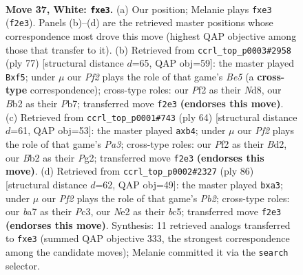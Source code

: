 \documentclass[11pt]{article}
\begin{document}
\clearpage

\begin{figure}[p]\centering
\begin{subfigure}{0.46\textwidth}\centering
\resizebox{\linewidth}{!}{%
\newchessgame
\chessboard[
  setfen={r5k1/b3n3/8/pp2N3/b1p3P1/P1P1p3/1B2NP2/R3K3 w - - 0 37},
  showmover=false,
  pgfstyle=straightmove, color=movearrow, markmove={f2-e3}
]}
\caption{}
\end{subfigure}\hfill
\begin{subfigure}{0.46\textwidth}\centering
\resizebox{\linewidth}{!}{%
\newchessgame
\chessboard[
  setfen={r2n2k1/1p3pp1/4P2p/5P2/p3b3/B5PP/B2R4/6K1 b - - 0 39},
  showmover=false,
  pgfstyle=straightmove, color=movearrow, markmove={e4-f5}
]}
\caption{}
\end{subfigure}
\\[4pt]
\begin{subfigure}{0.46\textwidth}\centering
\resizebox{\linewidth}{!}{%
\newchessgame
\chessboard[
  setfen={1r4k1/4n1b1/p5p1/4p2p/1pN1P3/P6P/3B2P1/4RK2 w - - 0 33},
  showmover=false,
  pgfstyle=straightmove, color=movearrow, markmove={a3-b4}
]}
\caption{}
\end{subfigure}\hfill
\begin{subfigure}{0.46\textwidth}\centering
\resizebox{\linewidth}{!}{%
\newchessgame
\chessboard[
  setfen={2r1b3/1p3p1k/5Bpp/2b1P3/5N1P/p1P3K1/1P4P1/3R4 w - - 0 44},
  showmover=false,
  pgfstyle=straightmove, color=movearrow, markmove={b2-a3}
]}
\caption{}
\end{subfigure}
\caption{\textbf{Move 37, White: \texttt{fxe3}.} (a) Our position; Melanie plays \texttt{fxe3} (\texttt{f2e3}). Panels (b)--(d) are the retrieved master positions whose correspondence most drove this move (highest QAP objective among those that transfer to it). (b) Retrieved from \texttt{ccrl\_top\_p0003\#2958} (ply 77) [structural distance $d$=65, QAP obj=59]: the master played \texttt{Bxf5}; under $\mu$ our \emph{Pf2} plays the role of that game's \emph{Be5} (a \textbf{cross-type} correspondence); cross-type roles: our \emph{P}f2 as their \emph{N}d8, our \emph{B}b2 as their \emph{P}b7; transferred move \texttt{f2e3} \textbf{(endorses this move)}. (c) Retrieved from \texttt{ccrl\_top\_p0001\#743} (ply 64) [structural distance $d$=61, QAP obj=53]: the master played \texttt{axb4}; under $\mu$ our \emph{Pf2} plays the role of that game's \emph{Pa3}; cross-type roles: our \emph{P}f2 as their \emph{B}d2, our \emph{B}b2 as their \emph{P}g2; transferred move \texttt{f2e3} \textbf{(endorses this move)}. (d) Retrieved from \texttt{ccrl\_top\_p0002\#2327} (ply 86) [structural distance $d$=62, QAP obj=49]: the master played \texttt{bxa3}; under $\mu$ our \emph{Pf2} plays the role of that game's \emph{Pb2}; cross-type roles: our \emph{b}a7 as their \emph{P}c3, our \emph{N}e2 as their \emph{b}c5; transferred move \texttt{f2e3} \textbf{(endorses this move)}. Synthesis: 11 retrieved analogs transferred to \texttt{fxe3} (summed QAP objective 333, the strongest correspondence among the candidate moves); Melanie committed it via the \texttt{search} selector.}
\label{fig:thought-m72}
\end{figure}
\end{document}
